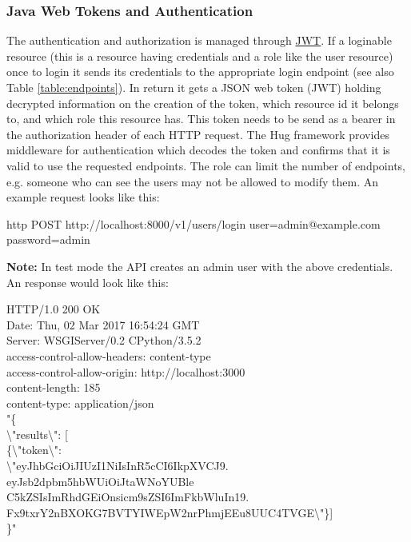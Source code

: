 \subsubsection{Java Web Tokens and Authentication}\label{subsubsection:auth}
The authentication and authorization is managed through \href{https://github.com/jpadilla/pyjwt}{JWT}. If a loginable resource (this is a resource having credentials and a role like the  user resource) once to login it sends its credentials to the appropriate login endpoint (see also Table \ref{table:endpoints}). In return it gets a JSON web token (JWT) holding decrypted information on the creation of the token, which resource id it belongs to, and which role this resource has. This token needs to be send as a bearer in the authorization header of each HTTP request. The Hug framework provides middleware for authentication which decodes the token and confirms that it is valid to use the requested endpoints. The role can limit the number of endpoints, e.g. someone who can see the users may not be allowed to modify them. An example request looks like this:
\begin{tcolorbox}
	http POST http://localhost:8000/v1/users/login user=admin@example.com password=admin
\end{tcolorbox}
\textbf{Note:} In test mode the API creates an admin user with the above credentials.
An response would look like this:
\begin{tcolorbox}
HTTP/1.0 200 OK\\
Date: Thu, 02 Mar 2017 16:54:24 GMT\\
Server: WSGIServer/0.2 CPython/3.5.2\\
access-control-allow-headers: content-type\\
access-control-allow-origin: http://localhost:3000\\
content-length: 185\\
content-type: application/json\\

"\{\\
\textbackslash"results\textbackslash": [\\
\{\textbackslash"token\textbackslash": \\
\textbackslash"eyJhbGciOiJIUzI1NiIsInR5cCI6IkpXVCJ9.\\
eyJsb2dpbm5hbWUiOiJtaWNoYUBle\\
C5kZSIsImRhdGEiOnsicm9sZSI6ImFkbWluIn19.\\
Fx9txrY2nBXOKG7BVTYIWEpW2nrPhmjEEu8UUC4TVGE\textbackslash"\}]\\
\}"
\end{tcolorbox}
